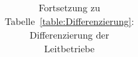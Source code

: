 \begin{table}
  \centering
  \caption{Fortsetzung zu Tabelle~\ref{table:Differenzierung}: Differenzierung der Leitbetriebe}
  \label{table:FortsetzungDifferenzierung}
  \begin{tabular}{|l|l|}
    \hline
			

\hline
  \end{tabular}
\end{table}
